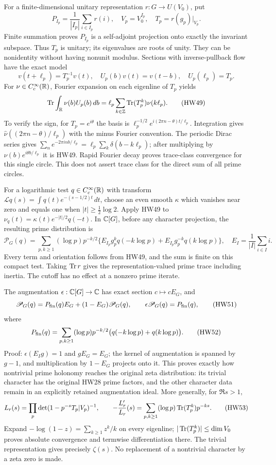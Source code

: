 For a finite-dimensional unitary representation \(r:G\to U(V_0)\),
put
\[
 P_{I_p}=\frac1{|I_p|}\sum_{i\in I_p}r(i),\quad
 V_p=V_0^{I_p},\quad T_p=r(g_p)|_{V_p}.
 \tag{HW47}
\]
Finite summation proves \(P_{I_p}\) is a self-adjoint
projection onto exactly the invariant subspace.
Thus \(T_p\) is unitary; its eigenvalues are roots of unity.
They can be nonidentity without having nonunit modulus.
Sections with inverse-pullback flow have the exact model
\[
 v(t+\ell_p)=T_p^{-1}v(t),\quad
 U_p(b)v(t)=v(t-b),\quad U_p(\ell_p)=T_p.
 \tag{HW48}
\]
For \(\nu\in C_c^\infty(\mathbb R)\), Fourier expansion on each
eigenline of \(T_p\) yields
\[
 \operatorname{Tr}\int_\mathbb R\nu(b)U_p(b)\,db
  =\ell_p\sum_{k\in\mathbb Z}\operatorname{Tr}(T_p^k)\nu(k\ell_p).
 \tag{HW49}
\]
To verify the sign, for \(T_p=e^{i\theta}\) the basis is
\(\ell_p^{-1/2}e^{i(2\pi n-\theta)t/\ell_p}\).
Integration gives \(\widehat\nu((2\pi n-\theta)/\ell_p)\)
with the minus Fourier convention. The periodic Dirac
series gives
\(\sum_n e^{-2\pi inb/\ell_p}
       =\ell_p\sum_k\delta(b-k\ell_p)\);
after multiplying by \(\nu(b)e^{i\theta b/\ell_p}\) it is
HW49. Rapid Fourier decay proves trace-class convergence
for this single circle. This does not assert trace class
for the direct sum of all prime circles.

For a logarithmic test \(q\in C_c^\infty(\mathbb R)\) with transform
\(\mathcal Lq(s)=\int q(t)e^{-(s-1/2)t}\,dt\),
choose an even smooth \(\kappa\) which vanishes near zero
and equals one when \(|t|\ge\frac12\log2\).
Apply HW49 to
\(\nu_q(t)=\kappa(t)e^{-|t|/2}q(-t)\).
In \(\mathbb C[G]\), before any character projection, the resulting
prime distribution is
\[
 \mathscr P_G(q)=
  \sum_{p,k\ge1}(\log p)p^{-k/2}
    \{E_{I_p}g_p^kq(-k\log p)
          +E_{I_p}g_p^{-k}q(k\log p)\},
 \quad E_I=\frac1{|I|}\sum_{i\in I}i .
 \tag{HW50}\label{hw:groupdistribution}
\]
Every term and orientation follows from HW49, and the sum
is finite on this compact test. Taking \(\operatorname{Tr} r\) gives
the representation-valued prime trace including inertia.
The cutoff has no effect at a nonzero prime iterate.

The augmentation \(\epsilon:\mathbb C[G]\to\mathbb C\) has exact section
\(c\mapsto cE_G\), and
\[
 \mathscr P_G(q)
 =P_{\rm fin}(q)E_G+(1-E_G)\mathscr P_G(q),\qquad
 \epsilon\mathscr P_G(q)=P_{\rm fin}(q),
 \tag{HW51}
\]
where
\[
 P_{\rm fin}(q)=
 \sum_{p,k\ge1}(\log p)p^{-k/2}
             \bigl(q(-k\log p)+q(k\log p)\bigr).
 \tag{HW52}
\]
Proof: \(\epsilon(E_Ig)=1\) and \(gE_G=E_G\);
the kernel of augmentation is spanned by \(g-1\), and
multiplication by \(1-E_G\) projects onto it.
This proves exactly how nontrivial prime holonomy reaches
the original zeta distribution: its trivial character has
the original HW28 prime factors, and the other character
data remain in an explicitly retained augmentation ideal.
More generally, for \(\Re s>1\),
\[
 L_r(s)=\prod_p\det(1-p^{-s}T_p|V_p)^{-1},\qquad
 -\frac{L_r'}{L_r}(s)
  =\sum_{p,k\ge1}(\log p)\operatorname{Tr}(T_p^k)p^{-ks}.
 \tag{HW53}
\]
Expand \(-\log(1-z)=\sum_{k\ge1}z^k/k\) on every
eigenline; \(|\operatorname{Tr}(T_p^k)|\le\dim V_0\) proves absolute
convergence and termwise differentiation there.
The trivial representation gives precisely \(\zeta(s)\).
No replacement of a nontrivial character by a zeta zero
is made.

